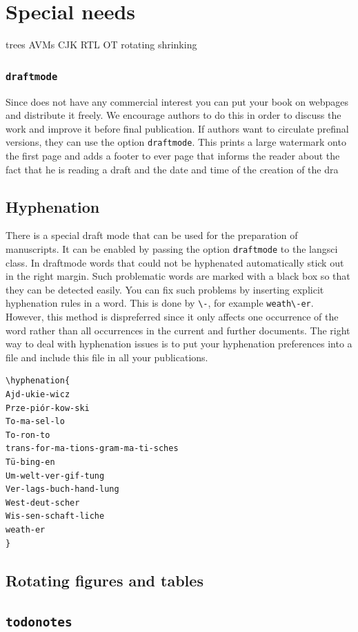 \section{Special needs}
trees
AVMs
CJK
RTL
OT
rotating
shrinking
   
\subsubsection{\texttt{draftmode}}

Since \lsp does not have any commercial interest you can put your book on webpages and distribute it
freely. We encourage authors to do this in order to discuss the work and improve it before final
publication. If authors want to circulate prefinal versions, they can use the option
\texttt{draftmode}. This prints a large watermark onto the first page and adds a footer to ever page
that informs the reader about the fact that he is reading a draft and the date and time of the
creation of the dra 
 
  
 
 
 

\subsection{Hyphenation}

There is a special draft mode that can be used for the preparation of manuscripts. It can be enabled
by passing the option \texttt{draftmode} to the langsci class. In draftmode words that could not be
hyphenated automatically stick out in the right margin. Such problematic words are marked with a
black box so that they can be detected easily. You can fix such problems by inserting explicit
hyphenation rules in a word. This is done by \verb+\-+, for example \verb+weath\-er+. However, this
method is dispreferred since it only affects one occurrence of the word rather than all occurrences in
the current and further documents. The right way to deal with hyphenation issues is to put your
hyphenation preferences into a file and include this file in all your publications. 

\begin{verbatim}
\hyphenation{
Ajd-ukie-wicz
Prze-piór-kow-ski
To-ma-sel-lo
To-ron-to
trans-for-ma-tions-gram-ma-ti-sches
Tü-bing-en
Um-welt-ver-gif-tung
Ver-lags-buch-hand-lung
West-deut-scher
Wis-sen-schaft-liche
weath-er
}
\end{verbatim}
 
\subsection{Rotating figures and tables}
 
 

\subsection{\texttt{todonotes}}




  